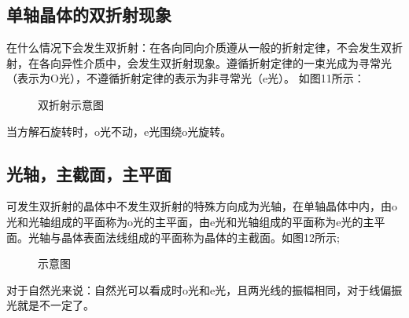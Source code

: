 \documentclass[UFT8]{article}
\begin{document}
\subsection{单轴晶体的双折射现象}
在什么情况下会发生双折射：在各向同向介质遵从一般的折射定律，不会发生双折射，在各向异性介质中，会发生双折射现象。遵循折射定律的一束光成为寻常光（表示为O光），不遵循折射定律的表示为非寻常光（e光）。
如图11所示：
\begin{figure}[htbp]
\begin{center}
\end{center}
\caption{双折射示意图}
\end{figure}
当方解石旋转时，o光不动，e光围绕o光旋转。
\subsection{光轴，主截面，主平面}
可发生双折射的晶体中不发生双折射的特殊方向成为光轴，在单轴晶体中内，由o光和光轴组成的平面称为o光的主平面，由e光和光轴组成的平面称为e光的主平面。光轴与晶体表面法线组成的平面称为晶体的主截面。如图12所示;
\begin{figure}[htbp]
\begin{center}
\qquad\qquad\qquad
{}
\end{center}
\caption{示意图}
\end{figure}
对于自然光来说：自然光可以看成时o光和e光，且两光线的振幅相同，对于线偏振光就是不一定了。
\end{document}
